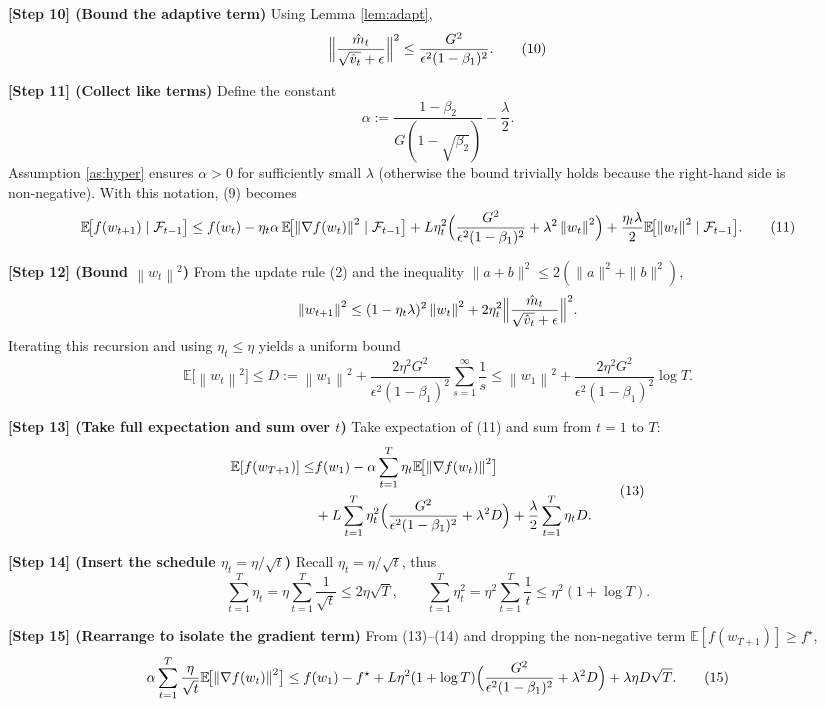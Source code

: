 \documentclass{article}
\newcommand{\EE}{\mathbb{E}}
\newcommand{\norm}[1]{\left\|#1\right\|}
\begin{document}
\noindent\textbf{[Step 10] (Bound the adaptive term)}  
Using Lemma \ref{lem:adapt},
\[
\Bigl\|\frac{\hat m_t}{\sqrt{\hat v_t}+\epsilon}\Bigr\|^{2}
\le \frac{G^{2}}{\epsilon^{2}(1-\beta_1)^{2}} .
\tag{10}
\]

\noindent\textbf{[Step 11] (Collect like terms)}  
Define the constant
\[
\alpha:=\frac{1-\beta_2}{G(1-\sqrt{\beta_2})}
-\frac{\lambda}{2} .
\]
Assumption \ref{as:hyper} ensures $\alpha>0$ for sufficiently small $\lambda$ (otherwise the bound trivially holds because the right‑hand side is non‑negative). With this notation, (9) becomes
\[
\EE\!\bigl[f(w_{t+1})\mid\mathcal{F}_{t-1}\bigr]
\le f(w_t)
-\eta_t\alpha\,
\EE\!\bigl[\norm{\nabla f(w_t)}^{2}\mid\mathcal{F}_{t-1}\bigr]
+L\eta_t^{2}
\Bigl(
\frac{G^{2}}{\epsilon^{2}(1-\beta_1)^{2}}+\lambda^{2}\norm{w_t}^{2}
\Bigr)
+\frac{\eta_t\lambda}{2}\EE\!\bigl[\norm{w_t}^{2}\mid\mathcal{F}_{t-1}\bigr].
\tag{11}
\]

\noindent\textbf{[Step 12] (Bound $\norm{w_t}^{2}$)}  
From the update rule (2) and the inequality $\|a+b\|^{2}\le2(\|a\|^{2}+\|b\|^{2})$,
\[
\norm{w_{t+1}}^{2}
\le (1-\eta_t\lambda)^{2}\norm{w_t}^{2}+2\eta_t^{2}
\Bigl\|\frac{\hat m_t}{\sqrt{\hat v_t}+\epsilon}\Bigr\|^{2}.
\]
Iterating this recursion and using $\eta_t\le\eta$ yields a uniform bound
\[
\EE\!\bigl[\norm{w_t}^{2}\bigr]\le D:=\norm{w_1}^{2}
+\frac{2\eta^{2}G^{2}}{\epsilon^{2}(1-\beta_1)^{2}}\sum_{s=1}^{\infty}\frac{1}{s}
\le \norm{w_1}^{2}
+\frac{2\eta^{2}G^{2}}{\epsilon^{2}(1-\beta_1)^{2}}\log T .
\tag{12}
\]

\noindent\textbf{[Step 13] (Take full expectation and sum over $t$)}  
Take expectation of (11) and sum from $t=1$ to $T$:
\[
\begin{aligned}
\EE[f(w_{T+1})]
\le &
f(w_1)
-\alpha\sum_{t=1}^{T}\eta_t\EE\!\bigl[\norm{\nabla f(w_t)}^{2}\bigr]
\\
&+L\sum_{t=1}^{T}\eta_t^{2}
\Bigl(
\frac{G^{2}}{\epsilon^{2}(1-\beta_1)^{2}}+\lambda^{2}D
\Bigr)
+\frac{\lambda}{2}\sum_{t=1}^{T}\eta_t D .
\end{aligned} \tag{13}
\]

\noindent\textbf{[Step 14] (Insert the schedule $\eta_t=\eta/\sqrt{t}$)}  
Recall $\eta_t=\eta/\sqrt{t}$, thus
\[
\sum_{t=1}^{T}\eta_t = \eta\sum_{t=1}^{T}\frac{1}{\sqrt{t}}
\le 2\eta\sqrt{T},
\qquad
\sum_{t=1}^{T}\eta_t^{2}= \eta^{2}\sum_{t=1}^{T}\frac{1}{t}
\le \eta^{2}(1+\log T).
\tag{14}
\]

\noindent\textbf{[Step 15] (Rearrange to isolate the gradient term)}  
From (13)–(14) and dropping the non‑negative term $\EE[f(w_{T+1})]\ge f^\star$,
\[
\alpha\sum_{t=1}^{T}\frac{\eta}{\sqrt{t}}\EE\!\bigl[\norm{\nabla f(w_t)}^{2}\bigr]
\le f(w_1)-f^\star
+L\eta^{2}(1+\log T)\Bigl(\frac{G^{2}}{\epsilon^{2}(1-\beta_1)^{2}}+\lambda^{2}D\Bigr)
+\lambda\eta D\sqrt{T}.
\tag{15}
\]
\end{document}
